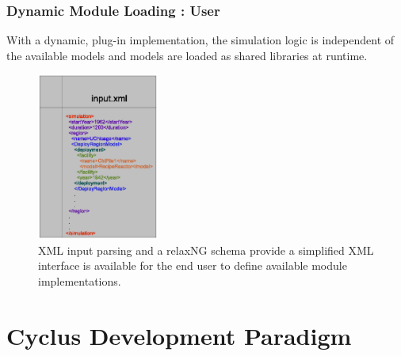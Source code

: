 \documentclass[9pt]{beamer}
\begin{document}
\begin{frame}[ctb!]
  \frametitle{Dynamic Module Loading : User}
  With a dynamic, plug-in implementation, the simulation logic is 
  independent of the available models and models are loaded as shared 
  libraries at runtime. 

  \begin{figure}[htbp!]
    \begin{center}
      \includegraphics[height=5.5cm]{user.eps}
    \end{center}
    \caption { XML input parsing and a relaxNG schema provide 
    a simplified XML interface is available for the end
    user to define available module implementations.  }
    \label{fig:xmlinput}
  \end{figure}

\end{frame}

\section{Cyclus Development Paradigm}
\end{document}
